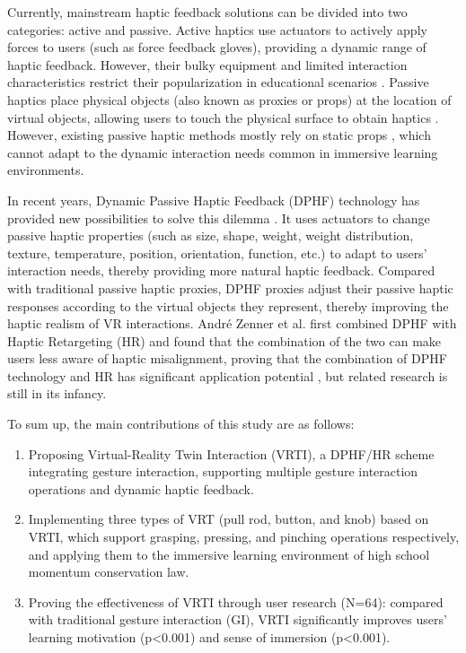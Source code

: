 \documentclass[runningheads]{llncs}
\begin{document}
Currently, mainstream haptic feedback solutions can be divided into two categories: active and passive. Active haptics use actuators to actively apply forces to users (such as force feedback gloves), providing a dynamic range of haptic feedback. However, their bulky equipment and limited interaction characteristics restrict their popularization in educational scenarios \cite{bonfert2023challenges,shigeyama2019transcalibur}. Passive haptics place physical objects (also known as proxies or props) at the location of virtual objects, allowing users to touch the physical surface to obtain haptics \cite{hinckley1994passive}. However, existing passive haptic methods mostly rely on static props \cite{strandholt2020knock,fang2023vr,rettinger2023touching}, which cannot adapt to the dynamic interaction needs common in immersive learning environments.

In recent years, Dynamic Passive Haptic Feedback (DPHF) technology has provided new possibilities to solve this dilemma \cite{zenner2017shifty}. It uses actuators to change passive haptic properties (such as size, shape, weight, weight distribution, texture, temperature, position, orientation, function, etc.) to adapt to users' interaction needs, thereby providing more natural haptic feedback. Compared with traditional passive haptic proxies, DPHF proxies adjust their passive haptic responses according to the virtual objects they represent, thereby improving the haptic realism of VR interactions. André Zenner et al. first combined DPHF with Haptic Retargeting (HR) and found that the combination of the two can make users less aware of haptic misalignment, proving that the combination of DPHF technology and HR has significant application potential \cite{zenner2021combining}, but related research is still in its infancy.

To sum up, the main contributions of this study are as follows:

\begin{enumerate}[label={\arabic*)}]
  \item Proposing Virtual-Reality Twin Interaction (VRTI), a DPHF/HR scheme integrating gesture interaction, supporting multiple gesture interaction operations and dynamic haptic feedback.
  \item Implementing three types of VRT (pull rod, button, and knob) based on VRTI, which support grasping, pressing, and pinching operations respectively, and applying them to the immersive learning environment of high school momentum conservation law.
  \item Proving the effectiveness of VRTI through user research (N=64): compared with traditional gesture interaction (GI), VRTI significantly improves users' learning motivation (p<0.001) and sense of immersion (p<0.001).
\end{enumerate}
\end{document}
